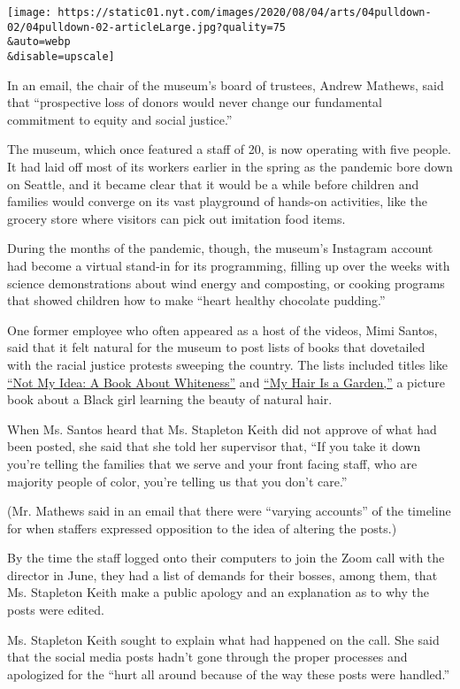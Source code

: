 \texttt{[image: https://static01.nyt.com/images/2020/08/04/arts/04pulldown-02/04pulldown-02-articleLarge.jpg?quality=75\\\&auto=webp\\\&disable=upscale]}

In an email, the chair of the museum's board of trustees, Andrew
Mathews, said that ``prospective loss of donors would never change our
fundamental commitment to equity and social justice.''

The museum, which once featured a staff of 20, is now operating with
five people. It had laid off most of its workers earlier in the spring
as the pandemic bore down on Seattle, and it became clear that it would
be a while before children and families would converge on its vast
playground of hands-on activities, like the grocery store where visitors
can pick out imitation food items.

During the months of the pandemic, though, the museum's Instagram
account had become a virtual stand-in for its programming, filling up
over the weeks with science demonstrations about wind energy and
composting, or cooking programs that showed children how to make ``heart
healthy chocolate pudding.''

One former employee who often appeared as a host of the videos, Mimi
Santos, said that it felt natural for the museum to post lists of books
that dovetailed with the racial justice protests sweeping the country.
The lists included titles like
\href{https://anastasiahigginbotham.com/not-my-idea/}{``Not My Idea: A
Book About Whiteness''} and
\href{https://www.albertwhitman.com/book/my-hair-is-a-garden/}{``My Hair
Is a Garden,''} a picture book about a Black girl learning the beauty of
natural hair.

When Ms. Santos heard that Ms. Stapleton Keith did not approve of what
had been posted, she said that she told her supervisor that, ``If you
take it down you're telling the families that we serve and your front
facing staff, who are majority people of color, you're telling us that
you don't care.''

(Mr. Mathews said in an email that there were ``varying accounts'' of
the timeline for when staffers expressed opposition to the idea of
altering the posts.)

By the time the staff logged onto their computers to join the Zoom call
with the director in June, they had a list of demands for their bosses,
among them, that Ms. Stapleton Keith make a public apology and an
explanation as to why the posts were edited.

Ms. Stapleton Keith sought to explain what had happened on the call. She
said that the social media posts hadn't gone through the proper
processes and apologized for the ``hurt all around because of the way
these posts were handled.''

